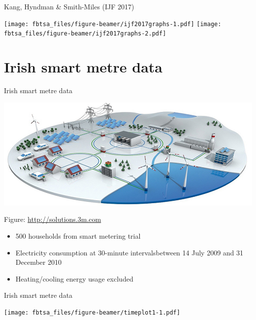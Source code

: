 \documentclass[14pt,ignorenonframetext,]{beamer}
\providecommand{\tightlist}{%
  \setlength{\itemsep}{0pt}\setlength{\parskip}{0pt}}
\begin{document}
\begin{frame}{Kang, Hyndman \& Smith-Miles (IJF 2017)}
\protect\hypertarget{kang-hyndman-smith-miles-ijf-2017}{}

\texttt{[image: fbtsa\_files/figure-beamer/ijf2017graphs-1.pdf]}
\texttt{[image: fbtsa\_files/figure-beamer/ijf2017graphs-2.pdf]}

\end{frame}

\hypertarget{irish-smart-metre-data}{%
\section{Irish smart metre data}\label{irish-smart-metre-data}}

\begin{frame}{Irish smart metre data}
\protect\hypertarget{irish-smart-metre-data-1}{}

\centerline{\includegraphics[width=1.18\linewidth]{SMARTGRID.jpg}}
  \vspace{-.85cm}
  \begin{flushright}
    { \tiny Figure: \url{http://solutions.3m.com}}
  \end{flushright}\vspace*{-0.4cm}\fontsize{12}{13}\sf

\begin{itemize}
\tightlist
\item
  500 households from smart metering trial
\item
  Electricity consumption at 30-minute intervals\newline between 14 July
  2009 and 31 December 2010
\item
  Heating/cooling energy usage excluded
\end{itemize}

\end{frame}

\begin{frame}{Irish smart metre data}
\protect\hypertarget{irish-smart-metre-data-2}{}

\texttt{[image: fbtsa\_files/figure-beamer/timeplot1-1.pdf]}

\end{frame}
\end{document}
